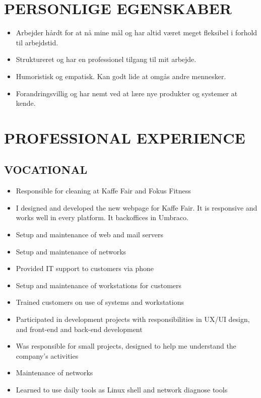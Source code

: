 \documentclass[11pt,a4paper,sans]{moderncv}        %
\begin{document}
\section{PERSONLIGE EGENSKABER}
\begin{itemize}
\item Arbejder hårdt for at nå mine mål og har altid været meget fleksibel i forhold til arbejdstid.
\item Struktureret og har en professionel tilgang til mit arbejde.
\item Humoristisk og empatisk. Kan godt lide at omgås andre mennesker.
\item Forandringsvillig og har nemt ved at lære nye produkter og systemer at kende.
\end{itemize}
\fi

\ifenglish
\section{PROFESSIONAL EXPERIENCE}
\subsection{VOCATIONAL}
\begin{itemize}
\item Responsible for cleaning at Kaffe Fair and Fokus Fitness
\end{itemize}
\bigskip
{}
\begin{itemize}
\item I designed and developed the new webpage for Kaffe Fair. It is responsive and works well in every platform. It backoffices in Umbraco.
\end{itemize}
\bigskip
{}
\begin{itemize}
\item Setup and maintenance of web and mail servers
\item Setup and maintenance of networks
\item Provided IT support to customers via phone
\item Setup and maintenance of workstations for customers
\item Trained customers on use of systems and workstations
\item Participated in development projects with responsibilities in UX/UI design, and front-end and back-end development
\end{itemize}
\bigskip
{}
\begin{itemize}
\item Was responsible for small projects, designed to help me understand the company's activities
\item Maintenance of networks
\item Learned to use daily tools as Linux shell and network diagnose tools
\end{itemize}
\bigskip
\end{document}
